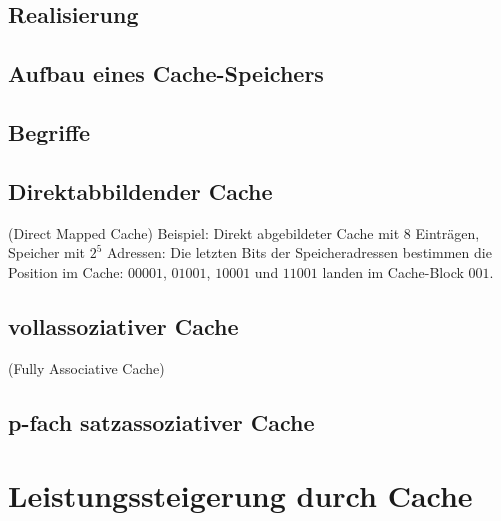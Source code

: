 \subsection{Realisierung}

\subsection{Aufbau eines Cache-Speichers}

\subsection{Begriffe}

\subsection{Direktabbildender Cache}
(Direct Mapped Cache)
Beispiel: Direkt abgebildeter Cache mit 8 Einträgen, Speicher mit $2^5$ Adressen: Die letzten Bits der Speicheradressen bestimmen die Position im Cache: $00001$, $01001$, $10001$ und $11001$ landen im Cache-Block $001$.

\subsection{vollassoziativer Cache}
(Fully Associative Cache)

\subsection{p-fach satzassoziativer Cache}

\section{Leistungssteigerung durch Cache}


